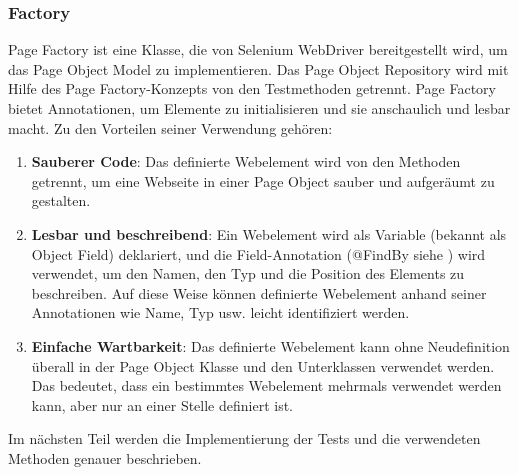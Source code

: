 \subsubsection{Factory}

Page Factory ist eine Klasse, die von Selenium WebDriver bereitgestellt
wird, um das Page Object Model zu implementieren. Das Page Object
Repository wird mit Hilfe des Page Factory-Konzepts von den Testmethoden
getrennt. Page Factory bietet Annotationen, um Elemente zu initialisieren und sie
anschaulich und lesbar macht. Zu den Vorteilen seiner Verwendung gehören:

\begin{enumerate}
    \item \textbf{Sauberer Code}: Das definierte Webelement wird von den Methoden
    getrennt, um eine Webseite in einer Page Object sauber und
    aufgeräumt zu gestalten.
    \item \textbf{Lesbar und beschreibend}: Ein Webelement wird als Variable
    (bekannt als Object Field) deklariert, und die Field-Annotation
    (@FindBy siehe ) wird verwendet, um den Namen, den Typ und
    die Position des Elements zu beschreiben. Auf diese Weise können
    definierte Webelement anhand seiner Annotationen wie Name, Typ
    usw. leicht identifiziert werden.
    \item \textbf{Einfache Wartbarkeit}: Das definierte Webelement kann ohne
    Neudefinition überall in der Page Object Klasse und den Unterklassen
    verwendet werden. Das bedeutet, dass ein bestimmtes Webelement
    mehrmals verwendet werden kann, aber nur an einer Stelle
    definiert ist.
\end{enumerate}


Im nächsten Teil werden die Implementierung der Tests und die verwendeten
Methoden genauer beschrieben.



